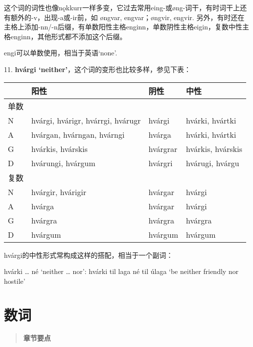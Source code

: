 这个词的词性也像nǫkkurr一样多变，它过去常用eing-或øng-词干，有时词干上还有额外的-v，出现-a或-ir前，如
øngvar, engvar；øngvir, engvir.
另外，有时还在主格上添加-nn/-n后缀，有单数阳性主格enginn，单数阴性主格eigin，复数中性主格enginn，其他形式都不添加这个后缀。

engi可以单数使用，相当于英语`none'.

11. \textbf{hvárgi `neither'}，这个词的变形也比较多样，参见下表：

\begin{longtable}{llll}
  \toprule
       & 阳性                              & 阴性     & 中性              \\
  \midrule
  \endhead
  \bottomrule
  \endfoot
  单数 &                                   &          &                   \\
  N    & hvárgi, hvárigr, hvárrgi, hvárugr & hvárgi   & hvárki, hvártki   \\
  A    & hvárgan, hvárngan, hvárngi        & hvárga   & hvárki, hvártki   \\
  G    & hvárkis, hvárskis                 & hvárgrar & hvárkis, hvárskis \\
  D    & hvárungi, hvárgum                 & hvárgri  & hvárugi, hvárgu   \\
  复数 &                                   &          &                   \\
  N    & hvárgir, hvárigir                 & hvárgar  & hvárgi            \\
  A    & hvárga                            & hvárgar  & hvárgi            \\
  G    & hvárgra                           & hvárgra  & hvárgra           \\
  D    & hvárgum                           & hvárgum  & hvárgum           \\
\end{longtable}

hvárgi的中性形式常构成这样的搭配，相当于一个副词：

hvárki \ldots{} né `neither \ldots{} nor': hvárki til laga né til úlaga
`be neither friendly nor hostile'

\chapter{数词}\label{数词}

\begin{quote}
  \textbf{章节要点}
\end{quote}

